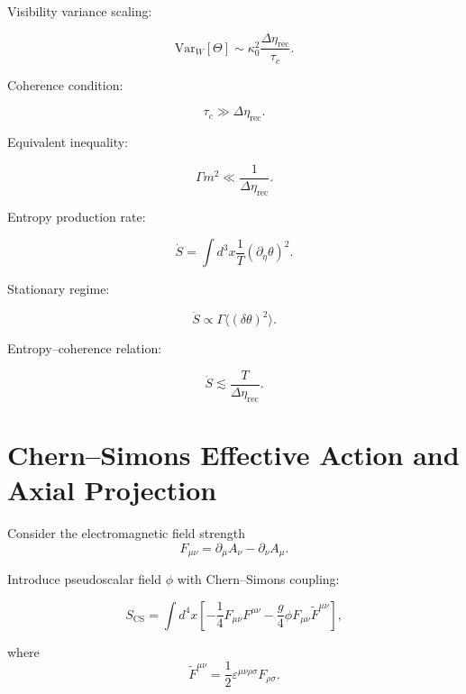 \documentclass[12pt]{article}
\begin{document}
Visibility variance scaling:

\begin{equation}
\mathrm{Var}_W[\Theta]
\sim
\kappa_0^2
\frac{\Delta\eta_{\mathrm{rec}}}{\tau_c}.
\end{equation}

Coherence condition:

\begin{equation}
\tau_c
\gg
\Delta\eta_{\mathrm{rec}}.
\end{equation}

Equivalent inequality:

\begin{equation}
\Gamma m^2
\ll
\frac{1}{\Delta\eta_{\mathrm{rec}}}.
\end{equation}

Entropy production rate:

\begin{equation}
\dot{S}
=
\int d^3x
\frac{1}{T}
\left(
\partial_\eta \theta
\right)^2.
\end{equation}

Stationary regime:

\begin{equation}
\dot{S}
\propto
\Gamma
\langle (\delta\theta)^2 \rangle.
\end{equation}

Entropy--coherence relation:

\begin{equation}
\dot{S}
\lesssim
\frac{T}{\Delta\eta_{\mathrm{rec}}}.
\end{equation}

\section{Chern--Simons Effective Action and Axial Projection}

Consider the electromagnetic field strength
\begin{equation}
F_{\mu\nu} = \partial_\mu A_\nu - \partial_\nu A_\mu.
\end{equation}

Introduce pseudoscalar field $\phi$ with Chern--Simons coupling:

\begin{equation}
S_{\mathrm{CS}}
=
\int d^4x
\left[
-\frac{1}{4} F_{\mu\nu}F^{\mu\nu}
-
\frac{g}{4}
\phi
F_{\mu\nu}\tilde{F}^{\mu\nu}
\right],
\end{equation}

where
\begin{equation}
\tilde{F}^{\mu\nu}
=
\frac{1}{2}
\varepsilon^{\mu\nu\rho\sigma}
F_{\rho\sigma}.
\end{equation}
\end{document}
